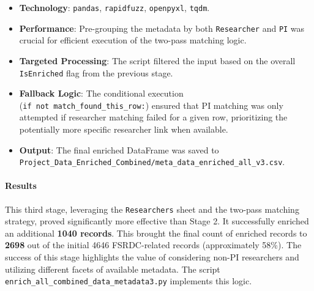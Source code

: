 \documentclass[12pt]{article}
\providecommand{\tightlist}{%
  \setlength{\itemsep}{0pt}\setlength{\parskip}{0pt}}
\begin{document}
\begin{itemize}
\tightlist
\item
  \textbf{Technology}: \texttt{pandas}, \texttt{rapidfuzz},
  \texttt{openpyxl}, \texttt{tqdm}.
\item
  \textbf{Performance}: Pre-grouping the metadata by both
  \texttt{Researcher} and \texttt{PI} was crucial for efficient
  execution of the two-pass matching logic.
\item
  \textbf{Targeted Processing}: The script filtered the input based on
  the overall \texttt{IsEnriched} flag from the previous stage.
\item
  \textbf{Fallback Logic}: The conditional execution
  (\texttt{if\ not\ match\_found\_this\_row:}) ensured that PI matching
  was only attempted if researcher matching failed for a given row,
  prioritizing the potentially more specific researcher link when
  available.
\item
  \textbf{Output}: The final enriched DataFrame was saved to
  \texttt{Project\_Data\_Enriched\_Combined/meta\_data\_enriched\_all\_v3.csv}.
\end{itemize}

\paragraph{Results}\label{results-4}

This third stage, leveraging the \texttt{Researchers} sheet and the
two-pass matching strategy, proved significantly more effective than
Stage 2. It successfully enriched an additional \textbf{1040 records}.
This brought the final count of enriched records to \textbf{2698} out of
the initial 4646 FSRDC-related records (approximately 58\%). The success
of this stage highlights the value of considering non-PI researchers and
utilizing different facets of available metadata. The script
\texttt{enrich\_all\_combined\_data\_metadata3.py} implements this
logic.
\end{document}
